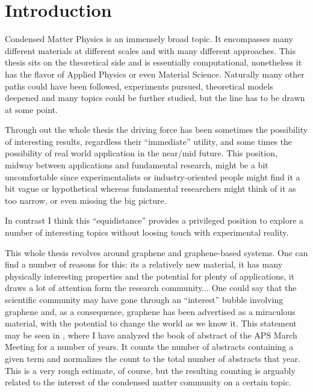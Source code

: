 \chapter{Introduction}

%
%

Condensed Matter Physics is an immensely broad topic. It encompasses many different materials at different scales and with many different approaches.
This thesis sits on the theoretical side and is essentially computational, nonetheless it has the flavor of Applied Physics or even Material Science. Naturally many other paths could have been followed, experiments pursued, theoretical models deepened and many topics could be further studied, but the line has to be drawn at some point.

Through out the whole thesis the driving force has been sometimes the possibility of interesting results, regardless their ``immediate'' utility, and some times the possibility of real world application in the near/mid future.
This position, midway between applications and fundamental research, might be a bit uncomfortable since experimentalists or industry-oriented people might find it a bit vague or hypothetical whereas fundamental researchers might think of it as too narrow, or even missing the big picture.

In contrast I think this ``equidistance'' provides a privileged position to explore a number of interesting topics without loosing touch with experimental reality.
\bigskip

This whole thesis revolves around graphene and graphene-based systems. One can find a number of reasons for this: its a relatively new material, it has many physically interesting properties and the potential for plenty of applications, it draws a lot of attention form the research community...
One could say that the scientific community may have gone through an ``interest'' bubble involving graphene and, as a consequence, graphene has been advertised as a miraculous material, with the potential to change the world as we know it. This statement may be seen in , where I have analyzed the book of abstract of the APS March Meeting for a number of years.
It counts the number of abstracts containing a given term and normalizes the count to the total number of abstracts that year. This is a very rough estimate, of course, but the resulting counting is arguably related to the interest of the condensed matter community on a certain topic.

